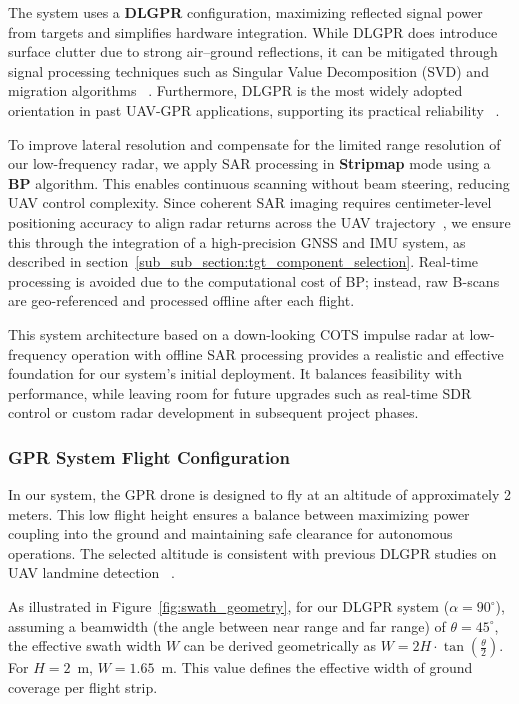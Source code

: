 The system uses a \textbf{\gls{DLGPR}} configuration, maximizing reflected signal power from targets and simplifies hardware integration. While \gls{DLGPR} does introduce surface clutter due to strong air–ground reflections, it can be mitigated through signal processing techniques such as Singular Value Decomposition (SVD) and migration algorithms ~\cite{garcia2024comparison}. Furthermore, \gls{DLGPR} is the most widely adopted orientation in past \gls{UAV}-\gls{GPR} applications, supporting its practical reliability ~\cite{alqudsi2021review}.

To improve lateral resolution and compensate for the limited range resolution of our low-frequency radar, we apply \gls{SAR} processing in \textbf{Stripmap} mode using a \textbf{\gls{BP}} algorithm. This enables continuous scanning without beam steering, reducing \gls{UAV} control complexity. Since coherent SAR imaging requires centimeter-level positioning accuracy to align radar returns across the UAV trajectory~\cite{fernandez2018synthetic}, we ensure this through the integration of a high-precision GNSS and IMU system, as described in section~\ref{sub_sub_section:tgt_component_selection}. Real-time processing is avoided due to the computational cost of \gls{BP}; instead, raw B-scans are geo-referenced and processed offline after each flight.


This system architecture based on a down-looking \gls{COTS} impulse radar at low-frequency operation with offline \gls{SAR} processing provides a realistic and effective foundation for our system’s initial deployment. It balances feasibility with performance, while leaving room for future upgrades such as real-time \gls{SDR} control or custom radar development in subsequent project phases.



\subsubsection{\gls{GPR} System Flight Configuration}\label{GPR_flight}

In our system, the \gls{GPR} drone is designed to fly at an altitude of approximately 2 meters. This low flight height ensures a balance between maximizing power coupling into the ground and maintaining safe clearance for autonomous operations. The selected altitude is consistent with previous \gls{DLGPR} studies on \gls{UAV} landmine detection ~\cite{schartel2018uav,alqudsi2021review}.

As illustrated in Figure~\ref{fig:swath_geometry}, for our \gls{DLGPR} system ($\alpha = 90^\circ$), assuming a beamwidth (the angle between near range and far range) of $\theta = 45^\circ$, the effective swath width $W$ can be derived geometrically as \(W = 2H \cdot \tan\left(\frac{\theta}{2}\right)\). For $H = 2$~m,  $W = 1.65$~m. This value defines the effective width of ground coverage per flight strip.

